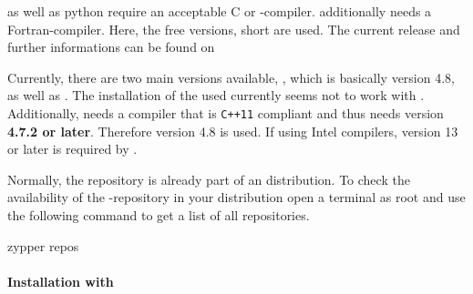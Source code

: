 % 
%               
%          
% 


\marktool[\tooladdress]{\toolnameshort} as well as \marktool{\pythonname} python require an acceptable C or \Cpp-compiler. \marktool{\trilinosname} additionally needs a Fortran-compiler. Here, the free  versions, short \marktool{\gccname} are used. The current release and further informations can be found on

\href{\gccaddress}{\gccaddress}

Currently, there are two main versions available, \marktool{\gccname}, which is basically \marktool{\gccname} version 4.8, as well as . The installation of the used \marktool{\pythonname} currently seems not to work with . Additionally, \marktool{\trilinosname} needs a compiler that is \verb|C++11| compliant and thus needs \marktool{\gccname} version \textbf{4.7.2 or later}. Therefore \marktool{\gccname} version 4.8 is used. If using Intel compilers, version 13 or later is required by \marktool{\trilinosname}.

Normally, the \marktool[\gccaddress]{\gccname} repository is already part of an \marktool[\opensuseaddress]{\opensusename} distribution. To check the availability of the \marktool[\gccaddress]{\gccname}-repository in your \marktool[\opensuseaddress]{\opensusename} distribution open a terminal as root and use the following command to get a list of all repositories.

\begin{code}
zypper repos
\end{code}

\paragraph{Installation with \marktool{\yastname}}

